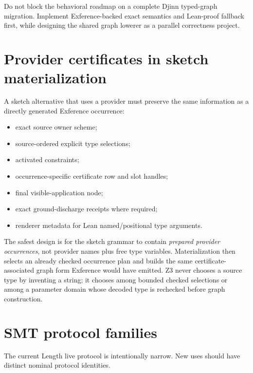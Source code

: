 \documentclass[11pt,oneside]{report}
\begin{document}
\begin{recommendation}
Do not block the behavioral roadmap on a complete Djinn typed-graph migration. Implement Exference-backed exact semantics and Lean-proof fallback first, while designing the shared graph lowerer as a parallel correctness project.
\end{recommendation}

\section{Provider certificates in sketch materialization}

A sketch alternative that uses a provider must preserve the same information as a directly generated Exference occurrence:

\begin{itemize}[leftmargin=2em]
\item exact source owner scheme;
\item source-ordered explicit type selections;
\item activated constraints;
\item occurrence-specific certificate row and slot handles;
\item final visible-application node;
\item exact ground-discharge receipts where required;
\item renderer metadata for Lean named/positional type arguments.
\end{itemize}

The safest design is for the sketch grammar to contain \emph{prepared provider occurrences}, not provider names plus free type variables. Materialization then selects an already checked occurrence plan and builds the same certificate-associated graph form Exference would have emitted. Z3 never chooses a source type by inventing a string; it chooses among bounded checked selections or among a parameter domain whose decoded type is rechecked before graph construction.

\section{SMT protocol families}

The current Length live protocol is intentionally narrow. New uses should have distinct nominal protocol identities.
\end{document}
